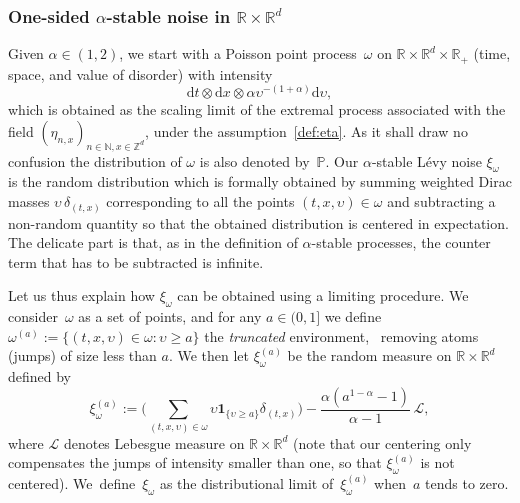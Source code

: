 \documentclass[JEP,XML,SOM,Unicode,published]{cedram}
\let\mathcal\mathscr
\let\sep:
\theoremstyle{definition}
\newcommand{\dd}{\mathrm{d}}
\newcommand{\ind}{\mathbf{1}}
\newcommand{\cL}{{\ensuremath{\mathcal L}} }
\newcommand{\bbN}{{\ensuremath{\mathbb N}} }
\newcommand{\bbP}{{\ensuremath{\mathbb P}} }
\newcommand{\bbR}{{\ensuremath{\mathbb R}} }
\newcommand{\bbZ}{{\ensuremath{\mathbb Z}} }
\let\ups\upsilon
\let\go\omega
\begin{document}
\subsubsection*{One-sided $\alpha$-stable noise in $\bbR\times \bbR^d$}
Given $\alpha\in(1,2)$, we start with a Poisson
point process~$\go$ on $\bbR\times \bbR^d\times \bbR_+$ (time, space, and value of disorder) with intensity
\begin{equation}
\label{Poissondens}
\dd t \otimes \dd x \otimes \alpha \ups^{-(1+\alpha)} \dd \ups,
\end{equation}
which is obtained as the scaling limit of the extremal process associated with the field $(\eta_{n,x})_{n \in \bbN, x\in \bbZ^d}$, under the assumption~\eqref{def:eta}.
As it shall draw no confusion the distribution of $\go$ is also denoted by~$\bbP$.
Our $\alpha$-stable Lévy noise $\xi_{\go}$ is the random distribution which is formally obtained by summing weighted Dirac masses $\ups\,\delta_{(t,x)}$ corresponding to all the points $(t,x,\ups)\in \go$ and subtracting a non-random quantity so that the obtained distribution is centered in expectation. The delicate part is that, as in the definition of $\alpha$-stable processes, the counter term that has to be subtracted is infinite.

Let us thus explain how $\xi_{\go}$ can be obtained using a limiting procedure.
We consider~$\go$ as a set of points, and for any $a\in(0,1]$ we define $\go^{(a)}:=\{ (t,x,\ups)\in \go \sep \ups\ge a\}$ the \emph{truncated} environment, \ie \ removing atoms (jumps) of size less than $a$.
We then let $\xi_{\go}^{(a)}$ be the random measure on $\bbR\times \bbR^d$ defined by
\begin{equation}
\label{def:omegabar}
\xi_{\go}^{(a)}:= \bigg(\sum_{(t,x,\ups)\in \go} \ups\ind_{\{\ups \ge a\}} \delta_{(t,x)} \bigg)- \frac{ \alpha (a^{1-\alpha}-1)}{\alpha-1} \, \cL,
\end{equation}
where $\cL$ denotes Lebesgue measure on $\bbR\times \bbR^d$
(note that our centering only compensates the jumps of intensity smaller than one, so that $\xi_{\go}^{(a)}$ is
not centered).
We~de\-fine~$\xi_{\go}$ as the distributional limit of~$ \xi_{\go}^{(a)}$ when~$a$ tends to zero.
\end{document}
